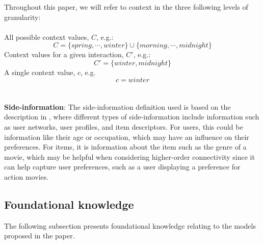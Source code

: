 Throughout this paper, we will refer to context in the three following levels of granularity:\\\\
All possible context values, $C$, e.g.:
$$C = \{spring, \cdots, winter\} \cup \{morning, \cdots, midnight\}$$
Context values for a given interaction, $C'$, e.g.:
$$C' = \{winter, midnight\}$$
A single context value, $c$, e.g. 
$$c = winter$$
\\\\
\textbf{Side-information}:
The side-information definition used is based on the description in \cite{SideInfoDefinition}, where different types of side-information include information such as user networks, user profiles, and item descriptors.
For users, this could be information like their age or occupation, which may have an influence on their preferences.
For items, it is information about the item such as the genre of a movie, which may be helpful when considering higher-order connectivity since it can help capture user preferences, such as a user displaying a preference for action movies.


\subsection{Foundational knowledge}\label{sec:foundational_knowledge}
The following subsection presents foundational knowledge relating to the models proposed in the paper.
